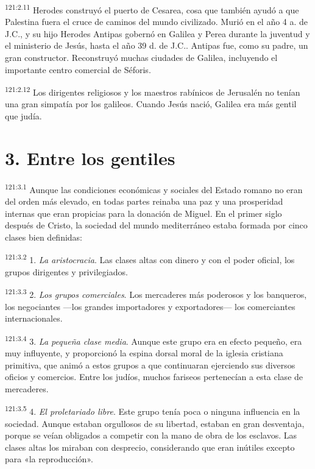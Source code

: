 \par 
\textsuperscript{121:2.11} Herodes construyó el puerto de Cesarea, cosa que también ayudó a que Palestina fuera el cruce de caminos del mundo civilizado. Murió en el año 4 a. de J.C., y su hijo Herodes Antipas gobernó en Galilea y Perea durante la juventud y el ministerio de Jesús, hasta el año 39 d. de J.C.. Antipas fue, como su padre, un gran constructor. Reconstruyó muchas ciudades de Galilea, incluyendo el importante centro comercial de Séforis.

\par 
\textsuperscript{121:2.12} Los dirigentes religiosos y los maestros rabínicos de Jerusalén no tenían una gran simpatía por los galileos. Cuando Jesús nació, Galilea era más gentil que judía.

\section*{3. Entre los gentiles}
\par 
\textsuperscript{121:3.1} Aunque las condiciones económicas y sociales del Estado romano no eran del orden más elevado, en todas partes reinaba una paz y una prosperidad internas que eran propicias para la donación de Miguel. En el primer siglo después de Cristo, la sociedad del mundo mediterráneo estaba formada por cinco clases bien definidas:

\par 
\textsuperscript{121:3.2} 1. \textit{La aristocracia}. Las clases altas con dinero y con el poder oficial, los grupos dirigentes y privilegiados.

\par 
\textsuperscript{121:3.3} 2. \textit{Los grupos comerciales}. Los mercaderes más poderosos y los banqueros, los negociantes ---los grandes importadores y exportadores--- los comerciantes internacionales.

\par 
\textsuperscript{121:3.4} 3. \textit{La pequeña clase media}. Aunque este grupo era en efecto pequeño, era muy influyente, y proporcionó la espina dorsal moral de la iglesia cristiana primitiva, que animó a estos grupos a que continuaran ejerciendo sus diversos oficios y comercios. Entre los judíos, muchos fariseos pertenecían a esta clase de mercaderes.

\par 
\textsuperscript{121:3.5} 4. \textit{El proletariado libre}. Este grupo tenía poca o ninguna influencia en la sociedad. Aunque estaban orgullosos de su libertad, estaban en gran desventaja, porque se veían obligados a competir con la mano de obra de los esclavos. Las clases altas los miraban con desprecio, considerando que eran inútiles excepto para «la reproducción».

